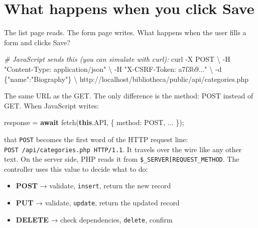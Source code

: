 \documentclass[11pt,a4paper,oneside]{book}
\newenvironment{Shaded}{\begin{snugshade}}{\end{snugshade}}
\newcommand{\KeywordTok}[1]{\textcolor[HTML]{007020}{\textbf{#1}}}
\newcommand{\DataTypeTok}[1]{\textcolor[HTML]{902000}{#1}}
\newcommand{\StringTok}[1]{\textcolor[HTML]{4070A0}{#1}}
\newcommand{\CommentTok}[1]{\textcolor[HTML]{60A0B0}{\textit{#1}}}
\newcommand{\FunctionTok}[1]{\textcolor[HTML]{06287E}{#1}}
\newcommand{\ControlFlowTok}[1]{\textcolor[HTML]{007020}{\textbf{#1}}}
\newcommand{\OperatorTok}[1]{\textcolor[HTML]{666666}{#1}}
\newcommand{\ExtensionTok}[1]{#1}
\newcommand{\AttributeTok}[1]{\textcolor[HTML]{7D9029}{#1}}
\newcommand{\NormalTok}[1]{#1}
\providecommand{\tightlist}{%
  \setlength{\itemsep}{0pt}\setlength{\parskip}{0pt}}
\begin{document}
\hypertarget{what-happens-when-you-click-save}{%
\section{What happens when you click
Save}\label{what-happens-when-you-click-save}}

The list page reads. The form page writes. What happens when the
user fills a form and clicks Save?

\begin{Shaded}
\begin{Highlighting}[]
\CommentTok{\# JavaScript sends this (you can simulate with curl):}
\ExtensionTok{curl} \AttributeTok{{-}X}\NormalTok{ POST }\DataTypeTok{\textbackslash{}}
     \AttributeTok{{-}H} \StringTok{"Content{-}Type: application/json"} \DataTypeTok{\textbackslash{}}
     \AttributeTok{{-}H} \StringTok{"X{-}CSRF{-}Token: a7f3b9..."} \DataTypeTok{\textbackslash{}}
     \AttributeTok{{-}d} \StringTok{\textquotesingle{}\{"name":"Biography"\}\textquotesingle{}} \DataTypeTok{\textbackslash{}}
\NormalTok{     http://localhost/bibliotheca/public/api/categories.php}
\end{Highlighting}
\end{Shaded}

The same URL as the GET. The only difference is the method: POST
instead of GET. When JavaScript writes:

\begin{Shaded}
\begin{Highlighting}[]
\NormalTok{response }\OperatorTok{=} \ControlFlowTok{await} \FunctionTok{fetch}\NormalTok{(}\KeywordTok{this}\OperatorTok{.}\AttributeTok{API}\OperatorTok{,}\NormalTok{ \{}
    \DataTypeTok{method}\OperatorTok{:} \StringTok{\textquotesingle{}POST\textquotesingle{}}\OperatorTok{,}
    \OperatorTok{...}
\NormalTok{\})}\OperatorTok{;}
\end{Highlighting}
\end{Shaded}

that \texttt{\textquotesingle{}POST\textquotesingle{}} becomes
the first word of the HTTP request line:
\texttt{POST\ /api/categories.php\ HTTP/1.1}. It travels over the
wire like any other text. On the server side, PHP reads it from
\texttt{\$\_SERVER{[}\textquotesingle{}REQUEST\_METHOD\textquotesingle{}{]}}.
The controller uses this value to decide what to do:

\begin{itemize}
\tightlist
\item
  \textbf{POST} → validate, \texttt{insert}, return the new
  record
\item
  \textbf{PUT} → validate, \texttt{update}, return the updated
  record
\item
  \textbf{DELETE} → check dependencies, \texttt{delete}, confirm
\end{itemize}
\end{document}
